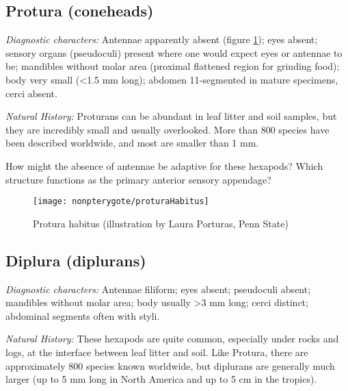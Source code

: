 \subsection{Protura (coneheads)}
\noindent{}\textit{Diagnostic characters:} Antennae apparently absent (figure \ref{fig:proturanhab}); eyes absent; sensory organs (pseudoculi) present where one would expect eyes or antennae to be; mandibles without molar area (proximal flattened region for grinding food); body very small (\textless1.5 mm long); abdomen 11-segmented in mature specimens, cerci absent.\vspace{3mm}

\noindent{}\textit{Natural History:} Proturans can be abundant in leaf litter and soil samples, but they are incredibly small and usually overlooked. More than 800 species have been described worldwide, and most are smaller than 1 mm.\vspace{3mm}

\begin{theo}
{}How might the absence of antennae be adaptive for these hexapods? Which structure functions as the primary anterior sensory appendage? \end{theo}\vspace{3mm}

\begin{figure}[ht!]
  \centering
    \texttt{[image: nonpterygote/proturaHabitus]}
  \caption{Protura habitus (illustration by Laura Porturas, Penn State)}
  \label{fig:proturanhab}
\end{figure}

\subsection{Diplura (diplurans)}
\noindent{}\textit{Diagnostic characters:} Antennae filiform; eyes absent; pseudoculi absent; mandibles without molar area; body usually \textgreater3 mm long; cerci distinct; abdominal segments often with styli.\vspace{3mm}

\noindent{}\textit{Natural History:} These hexapods are quite common, especially under rocks and logs, at the interface between leaf litter and soil. Like Protura, there are approximately 800 species known worldwide, but diplurans are generally much larger (up to 5 mm long in North America and up to 5 cm in the tropics).\vspace{3mm}

